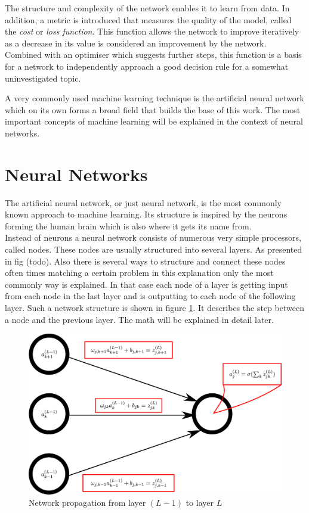 The structure and complexity of the network enables it to learn from data. In addition, a metric is introduced that measures the quality of the model, called the \emph{cost} or \emph{loss function}. This function allows the network to improve iteratively as a decrease in its value is considered an improvement by the network. Combined with an optimiser which suggests further steps, this function is a basis for a network to independently approach a good decision rule for a somewhat uninvestigated topic.

A very commonly used machine learning technique is the artificial neural network which on its own forms a broad field that builds the base of this work. The most important concepts of machine learning will be explained in the context of neural networks.

\section{Neural Networks}

The artificial neural network, or just neural network, is the most commonly known approach to machine learning. Its structure is inspired by the neurons forming the human brain which is also where it gets its name from.\\
Instead of neurons a neural network consists of numerous very simple processors, called nodes. These nodes are usually structured into several layers. As presented in fig (todo). Also there is several ways to structure and connect these nodes often times matching a certain problem in this explanation only the most commonly way is explained. In that case each node of a layer is getting input from each node in the last layer and is outputting to each node of the following layer. Such a network structure is shown in figure \ref{fig:nodes_nomenclature}. It describes the step between a node and the previous layer. The math will be explained in detail later.

\begin{figure}
	\centering
	\includegraphics[scale=0.18]{figures_ML/nodes_nomenclature.eps}
	\caption{Network propagation from layer $(L-1)$ to layer $L$}
	\label{fig:nodes_nomenclature}
\end{figure}


